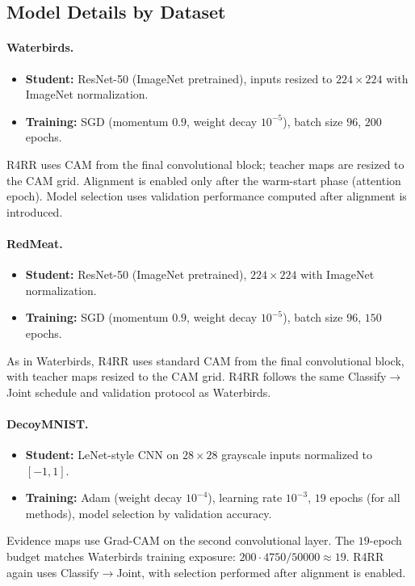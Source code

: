 \documentclass[10pt,twocolumn,letterpaper]{article}
\begin{document}
\subsection{Model Details by Dataset}\label{appendix:model_details}
\paragraph{Waterbirds.}
\begin{itemize}
    \item \textbf{Student:} ResNet-50\cite{he2016deep} (ImageNet pretrained), inputs resized to $224\times224$ with ImageNet normalization. 
    \item \textbf{Training:} SGD (momentum $0.9$, weight decay $10^{-5}$), batch size $96$, $200$ epochs. 
\end{itemize}

R4RR uses CAM from the final convolutional block; teacher maps are resized to the CAM grid. Alignment is enabled only after the warm-start phase (attention epoch). Model selection uses validation performance computed after alignment is introduced.

\paragraph{RedMeat.}
\begin{itemize}
    \item \textbf{Student:} ResNet-50\cite{he2016deep} (ImageNet pretrained), $224\times224$ with ImageNet normalization. 
    \item \textbf{Training:} SGD (momentum $0.9$, weight decay $10^{-5}$), batch size $96$, $150$ epochs. 
\end{itemize}

As in Waterbirds, R4RR uses standard CAM from the final convolutional block, with teacher maps resized to the CAM grid. R4RR follows the same Classify$\rightarrow$Joint schedule and validation protocol as Waterbirds.

\paragraph{DecoyMNIST.}
\begin{itemize}
    \item \textbf{Student:} LeNet-style CNN on $28\times28$ grayscale inputs normalized to $[-1,1]$. 
    \item \textbf{Training:} Adam (weight decay $10^{-4}$), learning rate $10^{-3}$, $19$ epochs (for all methods), model selection by validation accuracy. 
\end{itemize}
Evidence maps use Grad-CAM on the second convolutional layer. The $19$-epoch budget matches Waterbirds training exposure: $200\cdot 4750/50000 \approx 19$. R4RR again uses Classify$\rightarrow$Joint, with selection performed after alignment is enabled.
\end{document}
